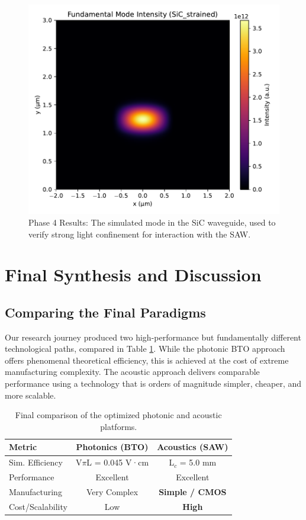 \documentclass{article}
\begin{document}
\begin{figure}[H]
    \centering
    \includegraphics[width=0.7\linewidth]{simulation_v4_mode_SiC_strained.pdf}
    \caption{Phase 4 Results: The simulated mode in the SiC waveguide, used to verify strong light confinement for interaction with the SAW.}
    \label{fig:sicmode}
\end{figure}

\section{Final Synthesis and Discussion}
\subsection{Comparing the Final Paradigms}
Our research journey produced two high-performance but fundamentally different technological paths, compared in Table \ref{tab:final_comp}. While the photonic BTO approach offers phenomenal theoretical efficiency, this is achieved at the cost of extreme manufacturing complexity. The acoustic approach delivers comparable performance using a technology that is orders of magnitude simpler, cheaper, and more scalable.

\begin{table}[H]
\caption{Final comparison of the optimized photonic and acoustic platforms.}
\label{tab:final_comp}
\centering
\begin{tabular}{lcc}
\toprule
\textbf{Metric} & \textbf{Photonics (BTO)} & \textbf{Acoustics (SAW)} \\
\midrule
Sim. Efficiency & V$\pi$L = 0.045 V·cm & L$_c$ = 5.0 mm \\
Performance & Excellent & Excellent \\
Manufacturing & Very Complex & \textbf{Simple / CMOS} \\
Cost/Scalability & Low & \textbf{High} \\
\bottomrule
\end{tabular}
\end{table}
\end{document}
